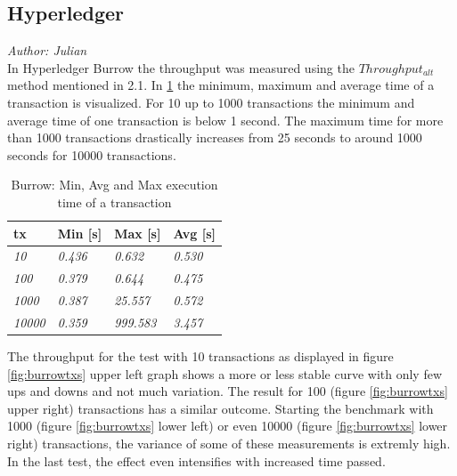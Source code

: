 \subsection{Hyperledger}

\textit{Author: Julian} \\
In Hyperledger Burrow the throughput was measured using the $Throughput_{alt}$ method mentioned in 2.1.
In \ref{table:4} the minimum, maximum and average time of a transaction is visualized. For 10 up to 1000 transactions
the minimum and average time of one transaction is below 1 second. The maximum time for more than 1000 transactions
drastically increases from 25 seconds to around 1000 seconds for 10000 transactions.

\begin{table}[!h]
\centering
\begin{tabular}{l|l|l|l|}
\hline
\multicolumn{1}{|l|}{\textbf{tx}} & \textbf{Min {[}s{]}} & \textbf{Max {[}s{]}} & \textbf{Avg {[}s{]}} \\ \hline
\multicolumn{1}{|l|}{\textit{10}} & \textit{0.436} & \textit{0.632} & \textit{0.530} \\ \hline
\multicolumn{1}{|l|}{\textit{100}} & \textit{0.379} & \textit{0.644} & \textit{0.475} \\ \hline
\multicolumn{1}{|l|}{\textit{1000}} & \textit{0.387} & \textit{25.557} & \textit{0.572} \\ \hline
\multicolumn{1}{|l|}{\textit{10000}} & \textit{0.359} & \textit{999.583} & \textit{3.457} \\ \hline 
\end{tabular}
\caption{Burrow: Min, Avg and Max execution time of a transaction}
\label{table:4}
\end{table}

The throughput for the test with 10 transactions as displayed in figure \ref{fig:burrowtxs} upper left graph shows a more or less
stable curve with only few ups and downs and not much variation. The result for 100 (figure \ref{fig:burrowtxs} upper right)
transactions has a similar outcome. Starting the benchmark with 1000 (figure \ref{fig:burrowtxs} lower left) or even 10000
(figure \ref{fig:burrowtxs} lower right) transactions, the variance of some of these measurements is extremly high. In
the last test, the effect even intensifies with increased time passed. \\[1cm]


